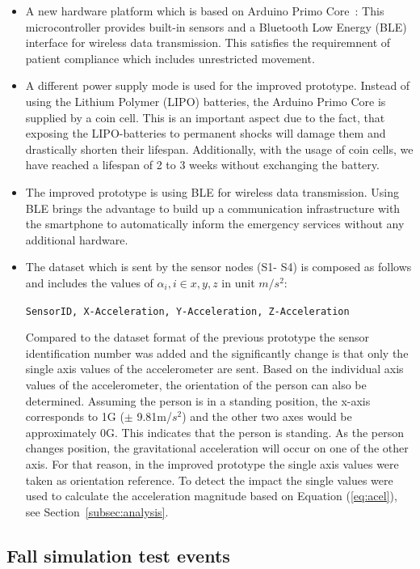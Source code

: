 \documentclass[journal]{IEEEtran}
\begin{document}
\begin{itemize}
 \item A new hardware platform which is based on Arduino Primo Core~\cite{Arduino2018}: 
 This microcontroller provides built-in sensors and a Bluetooth Low Energy (BLE) 
 interface for wireless data transmission. This satisfies the
 requiremnent of patient compliance
 which includes unrestricted movement.
 \item A different power supply mode is used for the improved prototype. Instead of 
 using the Lithium Polymer (LIPO) batteries, the Arduino Primo Core is supplied by a 
 coin cell. This is an important aspect due to the fact, that exposing the LIPO-batteries 
 to permanent shocks will damage them and drastically shorten their lifespan. 
 Additionally, with the usage of coin cells, we have reached a lifespan of 2 to 3 weeks 
 without exchanging the battery.
 \item The improved prototype is using BLE for wireless data transmission. Using BLE 
 brings the advantage to build up a communication infrastructure with the smartphone 
 to automatically inform the emergency services without any additional hardware.
 \item The dataset which is sent by the sensor nodes (S1- S4) is composed as follows 
 and includes the values of $\alpha_{i}, i \in {x,y,z}$ in unit $m/s^{2}$:
 \begin{center}
  \texttt{\small{SensorID, X-Acceleration, Y-Acceleration, Z-Acceleration}}
 \end{center}
 Compared to the dataset format of the previous prototype the sensor identification 
 number was added and the significantly change is that only the single axis values of 
 the accelerometer are sent. Based on the individual axis values of the accelerometer, 
 the orientation of the person can also be determined. Assuming the person is in a standing 
 position, the x-axis corresponds to 1G ($\pm$ 9.81m/$s^2$) and the other two axes would be 
 approximately 0G. This indicates that the person is standing. As the person changes 
 position, the gravitational acceleration will occur on one of the other axis. For that 
 reason, in the improved prototype the single axis values were taken as orientation 
 reference. To detect the impact the single values were used to calculate the acceleration 
 magnitude based on Equation (\ref{eq:acel}), see Section~\ref{subsec:analysis}.
\end{itemize}

\subsection{Fall simulation test events}
\end{document}
